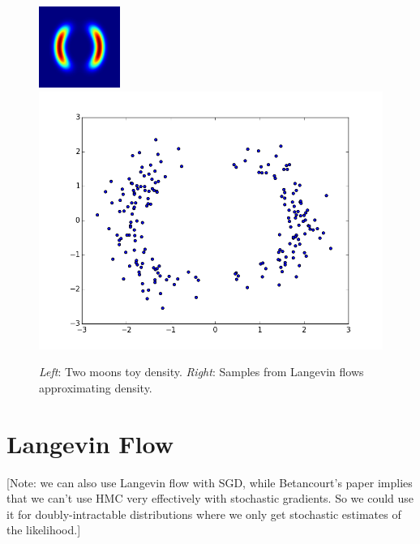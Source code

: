 \documentclass{article}
\begin{document}
\begin{figure}
\centerline{\includegraphics[height=0.34\textwidth, height=0.4\textwidth]{../montage/two_moons_density.png}
\hspace{2em}
\includegraphics[height=0.4\textwidth, height=0.4\textwidth]{../experiments/4-test-flows/2-langevin/approximating_dist.png}}
\caption{\emph{Left}: Two moons toy density.
\emph{Right}: Samples from Langevin flows approximating density.}
\label{fig:toy examples}
\end{figure}

\section{Langevin Flow}

[Note: we can also use Langevin flow with SGD, while Betancourt's paper implies that we can't use HMC very effectively with stochastic gradients.  So we could use it for doubly-intractable distributions where we only get stochastic estimates of the likelihood.]
\end{document}
